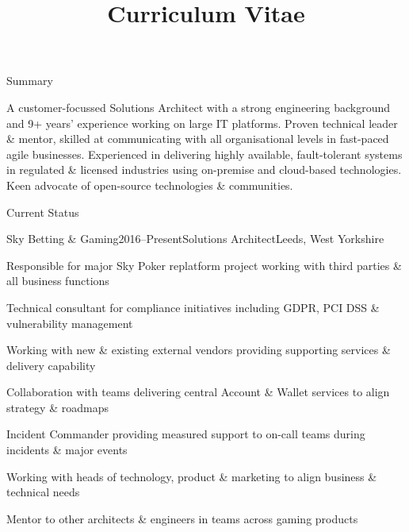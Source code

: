 \documentclass{cv}
\title{Curriculum Vitae}
\begin{document}

\begin{rSection}{Summary}

A customer-focussed Solutions Architect with a strong engineering background and 9+ years'
experience working on large IT platforms. Proven technical leader \& mentor, skilled at
communicating with all organisational levels in fast-paced agile businesses. Experienced in
delivering highly available, fault-tolerant systems in regulated \& licensed industries using
on-premise and cloud-based technologies. Keen advocate of open-source technologies \& communities.

\end{rSection}


\begin{rSection}{Current Status}

\begin{rSubsection}{Sky Betting \& Gaming}{2016--Present}{Solutions Architect}{Leeds, West Yorkshire}
\item Responsible for major Sky Poker replatform project working with third parties \& all business functions
\item Technical consultant for compliance initiatives including GDPR, PCI DSS \& vulnerability management
\item Working with new \& existing external vendors providing supporting services \& delivery capability
\item Collaboration with teams delivering central Account \& Wallet services to align strategy \& roadmaps
\item Incident Commander providing measured support to on-call teams during incidents \& major events
\item Working with heads of technology, product \& marketing to align business \& technical needs
\item Mentor to other architects \& engineers in teams across gaming products
\end{rSubsection}

\end{rSection}
\end{document}
